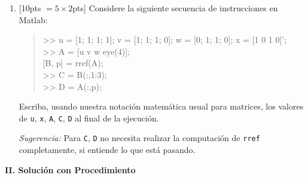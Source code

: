 \documentclass[11pt]{article}
\begin{document}
\begin{enumerate}
\item{}[10pts $=5\times 2$pts] Considere la siguiente secuencia de instrucciones en Matlab:
\begin{quote}
\ttfamily
\noindent >> u = [1; 1; 1; 1]; v = [1; 1; 1; 0]; w = [0; 1; 1; 0]; x = [1 0 1 0]';\\
>> A = [u v w eye(4)];\\
{[}B, p{]} = rref(A);\\
>> C = B(:,1:3);\\
>> D = A(:,p);
\end{quote}
\noindent Escriba, usando nuestra notación matemática usual para matrices, los valores de \texttt{u}, \texttt{x}, \texttt{A}, \texttt{C}, \texttt{D} al final de la ejecución.

\vspace{4pt}

\noindent \textit{Sugerencia:} Para \texttt{C}, \texttt{D} no necesita realizar la computación de \texttt{rref} completamente, si entiende lo que está pasando.
\end{enumerate}

\newpage
\noindent\textbf{\large II. Solución con Procedimiento}
\end{document}
